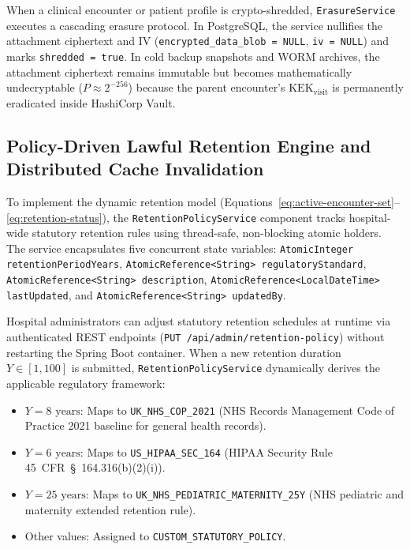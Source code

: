 When a clinical encounter or patient profile is crypto-shredded, \texttt{ErasureService} executes a cascading erasure protocol. In PostgreSQL, the service nullifies the attachment ciphertext and IV (\texttt{encrypted\_data\_blob = NULL}, \texttt{iv = NULL}) and marks \texttt{shredded = true}. In cold backup snapshots and WORM archives, the attachment ciphertext remains immutable but becomes mathematically undecryptable ($P \approx 2^{-256}$) because the parent encounter's $\text{KEK}_{\text{visit}}$ is permanently eradicated inside HashiCorp Vault.

\subsection{Policy-Driven Lawful Retention Engine and Distributed Cache Invalidation}

To implement the dynamic retention model (Equations~\ref{eq:active-encounter-set}--\ref{eq:retention-status}), the \texttt{RetentionPolicyService} component tracks hospital-wide statutory retention rules using thread-safe, non-blocking atomic holders. The service encapsulates five concurrent state variables: \texttt{AtomicInteger retentionPeriodYears}, \texttt{AtomicReference<String> regulatoryStandard}, \texttt{AtomicReference<String> description}, \texttt{AtomicReference<LocalDateTime> lastUpdated}, and \texttt{AtomicReference<String> updatedBy}. 

Hospital administrators can adjust statutory retention schedules at runtime via authenticated REST endpoints (\texttt{PUT /api/admin/retention-policy}) without restarting the Spring Boot container. When a new retention duration $Y \in [1, 100]$ is submitted, \texttt{RetentionPolicyService} dynamically derives the applicable regulatory framework:
\begin{itemize}
    \item $Y = 8\text{~years}$: Maps to \texttt{UK\_NHS\_COP\_2021} (NHS Records Management Code of Practice 2021 baseline for general health records).
    \item $Y = 6\text{~years}$: Maps to \texttt{US\_HIPAA\_SEC\_164} (HIPAA Security Rule 45~CFR~\S~164.316(b)(2)(i)).
    \item $Y = 25\text{~years}$: Maps to \texttt{UK\_NHS\_PEDIATRIC\_MATERNITY\_25Y} (NHS pediatric and maternity extended retention rule).
    \item Other values: Assigned to \texttt{CUSTOM\_STATUTORY\_POLICY}.
\end{itemize}


